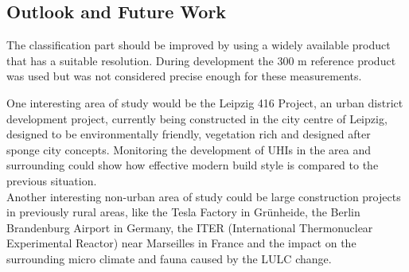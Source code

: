  
\subsection{Outlook and Future Work}
The classification part should be improved by using a widely available product that has a suitable resolution. 
During development the 300 m reference product~\cite{sec:references} was used but was not considered precise enough for these measurements.


One interesting area of study would be the Leipzig 416 Project, an urban district development project, currently being constructed in the city centre of Leipzig, designed to be environmentally friendly, vegetation rich and designed after sponge city concepts.
Monitoring the development of \glspl{UHI} in the area and surrounding could show how effective modern build style is compared to the previous situation.\\

Another interesting non-urban area of study could be large construction projects in previously rural areas, like the Tesla Factory in Grünheide, the Berlin Brandenburg Airport in Germany, the ITER (International Thermonuclear Experimental Reactor) near Marseilles in France and the impact on the surrounding micro climate and fauna caused by the \gls{LULC} change.


